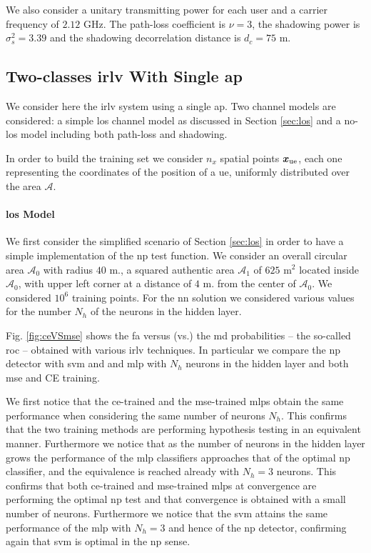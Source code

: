 \documentclass[draftcls,onecolumn,12pt]{IEEEtran}
\begin{document}
We also consider  a unitary transmitting power for each user and a carrier frequency of $2.12$ GHz. The path-loss coefficient is $\nu=3$, the shadowing power is $\sigma_s^2=3.39$ and the shadowing decorrelation distance is $d_c=75$ m. 


\subsection{Two-classes \ac{irlv} With Single \ac{ap}}

We consider here the \ac{irlv} system using a single \ac{ap}. Two channel models are considered: a simple \ac{los} channel model as discussed in Section \ref{sec:los} and a no-\ac{los} model including both path-loss and shadowing.

In order to build the training set we consider $n_x$ spatial points $\bm{x}_{\rm ue}$, each one representing the coordinates of the position of a \ac{ue}, uniformly distributed over the area $\mathcal A$.


\paragraph*{\ac{los} Model} We first consider the simplified scenario of Section \ref{sec:los} in order to have a simple implementation of the \ac{np} test function.  We consider an overall circular area $\mathcal{A}_0$ with radius $40$ m., a squared authentic area $\mathcal{A}_1$ of $625$ m$^2$ located inside $\mathcal{A}_0$, with upper left corner at a distance of $4$ m. from the center of $\mathcal{A}_0$. We considered $10^6$ training points. For the \ac{nn} solution we considered various values for the number $N_h$ of the neurons in the hidden layer.


Fig. \ref{fig:ceVSmse} shows the \ac{fa} versus (vs.) the \ac{md} probabilities -- the so-called \ac{roc} --  obtained with various \ac{irlv} techniques. In particular we compare the \ac{np} detector with \ac{svm} and and \ac{mlp} with $N_h$ neurons in the hidden layer and both \ac{mse} and CE training. 

We first notice that the \ac{ce}-trained and the \ac{mse}-trained \acp{mlp} obtain the same performance when considering the same number of neurons $N_h$. This confirms that the two training methods are performing hypothesis testing in an equivalent manner. Furthermore we notice that as the number of neurons in the hidden layer grows the performance of the \ac{mlp} classifiers approaches that of the optimal \ac{np} classifier, and the equivalence is reached already with $N_h=3$ neurons. This confirms that both \ac{ce}-trained and \ac{mse}-trained \acp{mlp} at convergence are performing the optimal \ac{np} test and that convergence is obtained with a small number of neurons. Furthermore we notice that the \ac{svm} attains the same performance of the \ac{mlp} with $N_h = 3$ and hence of the \ac{np} detector, confirming again that \ac{svm} is optimal in the \ac{np} sense.
\end{document}
